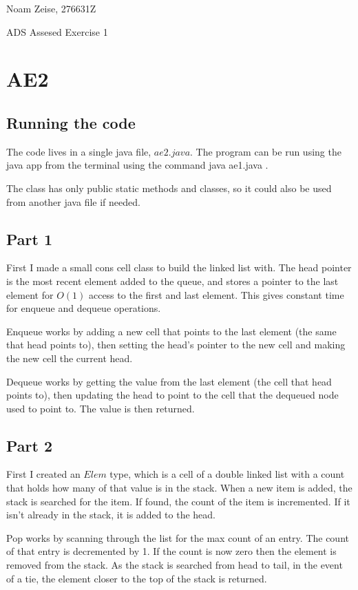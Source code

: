 \documentclass[11pt,a4paper,oneside, draft]{article}
\begin{document}
Noam Zeise, 276631Z

ADS Assesed Exercise 1

\section*{AE2}

\subsection*{Running the code}

The code lives in a single java file, $ae2.java$. The program can be
run using the java app from the terminal using the command java
ae1.java .

The class has only public static methods and classes, so it could also be used from another java file if needed.

\subsection*{Part 1}

First I made a small cons cell class to build the linked list
with. The head pointer is the most recent element added to the queue,
and stores a pointer to the last element for $O(1)$ access to the
first and last element. This gives constant time for enqueue and
dequeue operations.

Enqueue works by adding a new cell that points to
the last element (the same that head points to), then setting the
head's pointer to the new cell and making the new cell the current
head.

Dequeue works by getting the value from the last element (the cell
that head points to), then updating the head to point to the cell that
the dequeued node used to point to. The value is then returned.


\subsection*{Part 2}

First I created an $Elem$ type, which is a cell of a double linked list
with a count that holds how many of that value is in the stack. When a
new item is added, the stack is searched for the item. If found, the
count of the item is incremented. If it isn't already in the stack, it
is added to the head.

Pop works by scanning through the list for the max count of an entry.
The count of that entry is decremented by 1. If the count is now zero
then the element is removed from the stack. As the stack is searched
from head to tail, in the event of a tie, the element closer to the
top of the stack is returned.
\end{document}
